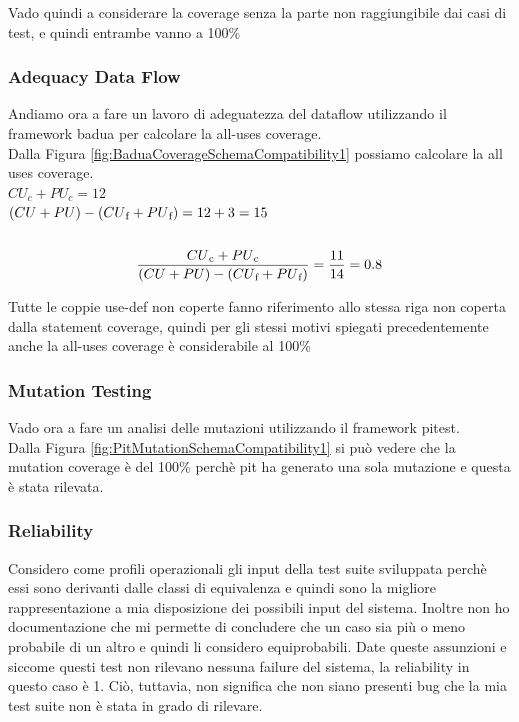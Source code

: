 \documentclass[12pt, a4paper]{article}
\begin{document}
Vado quindi a considerare la coverage senza la parte non raggiungibile dai casi di test, e quindi entrambe vanno a 100\%
\subsubsection{Adequacy Data Flow}
Andiamo ora a fare un lavoro di adeguatezza del dataflow utilizzando il framework badua per calcolare la all-uses coverage. \\
Dalla Figura \ref{fig:BaduaCoverageSchemaCompatibility1} possiamo calcolare la all uses coverage. \\
\(CU_c + PU_c = 12\) \\
\( (CU + PU) - (CU\textsubscript{f} + PU\textsubscript{f}) = 12 + 3 = 15\) \\ \\
\[\frac{{CU\textsubscript{c} + PU\textsubscript{c}}}{{(CU + PU) - (CU\textsubscript{f} + PU\textsubscript{f})}} = \frac{{11}}{{14}} = 0.8\]

Tutte le coppie use-def non coperte fanno riferimento allo stessa riga non coperta dalla statement coverage, quindi
per gli stessi motivi spiegati precedentemente anche la all-uses coverage è considerabile al 100\%
\subsubsection{Mutation Testing}
Vado ora a fare un analisi delle mutazioni utilizzando il framework pitest. \\
Dalla Figura \ref{fig:PitMutationSchemaCompatibility1} si può vedere che la mutation coverage è del 100\% perchè
pit ha generato una sola mutazione e questa è stata rilevata. \\


\subsubsection{Reliability}
Considero come profili operazionali gli input della test suite sviluppata perchè essi sono derivanti dalle classi di equivalenza
e quindi sono la migliore rappresentazione a mia disposizione dei possibili input del sistema. Inoltre non ho documentazione che
mi permette di concludere che un caso sia più o meno probabile di un altro e quindi li considero equiprobabili. Date queste 
assunzioni e siccome questi test non rilevano nessuna failure del sistema, la reliability in questo caso è 1. Ciò, tuttavia,
 non significa che non siano presenti bug che la mia test suite non è stata in grado di rilevare.
\end{document}
